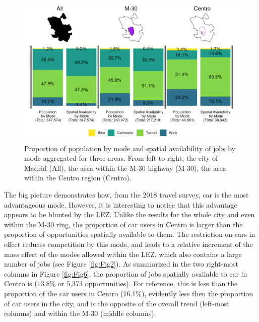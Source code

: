 \documentclass[10pt,letterpaper]{article}
\begin{document}
\begin{figure}

{\centering \includegraphics[width=0.85\linewidth]{images/Fig6} 

}

\caption{\label{fig:Fig6} Proportion of population by mode and spatial availability of jobs by mode aggregated for three areas. From left to right, the city of Madrid (All), the area within the M-30 highway (M-30), the area within the Centro region (Centro).}\label{fig:modal-V-comps-plot}
\end{figure}

The big picture demonstrates how, from the 2018 travel survey, car is
the most advantageous mode. However, it is interesting to notice that
this advantage appears to be blunted by the LEZ. Unlike the results for
the whole city and even within the M-30 ring, the proportion of car
users in Centro is larger than the proportion of opportunities spatially
available to them. The restriction on cars in effect reduces competition
by this mode, and leads to a relative increment of the mass effect of
the modes allowed within the LEZ, which also contains a large number of
jobs (see Figure \ref{fig:Fig2}). As summarized in the two right-most
columns in Figure \ref{fig:Fig6}, the proportion of jobs spatially
available to car in Centro is (13.8\% or 5,373 opportunities). For
reference, this is less than the proportion of the car users in Centro
(16.1\%), evidently less then the proportion of car users in the city,
and is the opposite of the overall trend (left-most columns) and within
the M-30 (middle columns).
\end{document}
